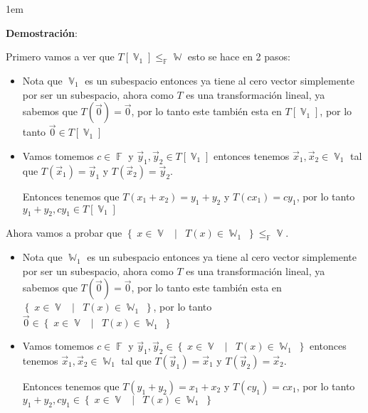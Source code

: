 \documentclass[12pt, fleqn]{article}                             %
\newenvironment{SmallIndentation}[1][0.75em]                    %
        {\begin{adjustwidth}{#1}{}\begin{footnotesize}}             %
        {\end{footnotesize}\end{adjustwidth}}                       %
\DeclareMathOperator \Space {\quad}                             %
\DeclareMathOperator \MiniSpace {\;}                            %
\newcommand \Such {\MiniSpace | \MiniSpace}                     %
\theoremstyle{break}                                            %
\DeclareMathOperator \GenericField {\mathbb{F}}                 %
\DeclareMathOperator \VectorSet    {\mathbb{V}}                 %
\DeclareMathOperator \SubVectorSet {\mathbb{W}}                 %
\newcommand{\Set}[1]    {\left\{ \; #1 \; \right\}}             %
\begin{document}
    \begin{SmallIndentation}[1em]
        \textbf{Demostración}:
        
        Primero vamos a ver que $T[\VectorSet_1] \leq_{\GenericField} \SubVectorSet$
        esto se hace en 2 pasos:
        \begin{itemize}
            \item 
                Nota que $\VectorSet_1$ es un subespacio entonces ya tiene al cero
                vector simplemente por ser un subespacio, ahora como $T$ es una transformación
                lineal, ya sabemos que $T(\vec 0) = \vec 0$, por lo tanto este también 
                esta en $T[\VectorSet_1]$, por lo tanto $\vec 0 \in T[\VectorSet_1]$

            \item
                Vamos tomemos $c \in \GenericField$ y $\vec y_1, \vec y_2 \in T[\VectorSet_1]$
                entonces tenemos $\vec x_1, \vec x_2 \in \VectorSet_1$ tal que 
                $T(\vec x_1) = \vec y_1$ y $T(\vec x_2) = \vec y_2$.

                Entonces tenemos que $T(x_1 + x_2) = y_1 + y_2$ y $T(cx_1) = cy_1$, por lo tanto
                $y_1 + y_2, cy_1 \in T[\VectorSet_1]$
        \end{itemize}

        Ahora vamos a probar que $\Set{x \in \VectorSet \Such T(x) \in \SubVectorSet_1} 
        \leq_{\GenericField} \VectorSet$.
        \begin{itemize}
            \item 
                Nota que $\SubVectorSet_1$ es un subespacio entonces ya tiene al cero
                vector simplemente por ser un subespacio, ahora como $T$ es una transformación
                lineal, ya sabemos que $T(\vec 0) = \vec 0$, por lo tanto este también 
                esta en $\Set{x \in \VectorSet \Such T(x) \in \SubVectorSet_1}$, por lo
                tanto $\vec 0 \in \Set{x \in \VectorSet \Such T(x) \in \SubVectorSet_1}$

            \item
                Vamos tomemos $c \in \GenericField$ y 
                $\vec y_1, \vec y_2 \in \Set{x \in \VectorSet \Such T(x) \in \SubVectorSet_1}$
                entonces tenemos $\vec x_1, \vec x_2 \in \SubVectorSet_1$ tal que 
                $T(\vec y_1) = \vec x_1$ y $T(\vec y_2) = \vec x_2$.

                Entonces tenemos que $T(y_1 + y_2) = x_1 + x_2$ y $T(cy_1) = cx_1$, por lo tanto
                $y_1 + y_2, cy_1 \in \Set{x \in \VectorSet \Such T(x) \in \SubVectorSet_1}$
        \end{itemize}

    \end{SmallIndentation}
                            
                        
\end{document}
